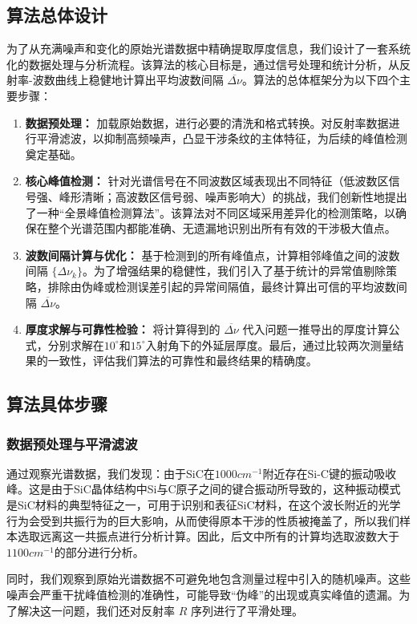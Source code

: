 \documentclass[withoutpreface,bwprint]{cumcmthesis} %
\begin{document}
\subsection{算法总体设计}
为了从充满噪声和变化的原始光谱数据中精确提取厚度信息，我们设计了一套系统化的数据处理与分析流程。该算法的核心目标是，通过信号处理和统计分析，从反射率-波数曲线上稳健地计算出平均波数间隔 $\overline{\Delta\nu}$。算法的总体框架分为以下四个主要步骤：
\begin{enumerate}
    \item \textbf{数据预处理：} 加载原始数据，进行必要的清洗和格式转换。对反射率数据进行平滑滤波，以抑制高频噪声，凸显干涉条纹的主体特征，为后续的峰值检测奠定基础。
    \item \textbf{核心峰值检测：} 针对光谱信号在不同波数区域表现出不同特征（低波数区信号强、峰形清晰；高波数区信号弱、噪声影响大）的挑战，我们创新性地提出了一种“全景峰值检测算法”。该算法对不同区域采用差异化的检测策略，以确保在整个光谱范围内都能准确、无遗漏地识别出所有有效的干涉极大值点。
    \item \textbf{波数间隔计算与优化：} 基于检测到的所有峰值点，计算相邻峰值之间的波数间隔 $\{\Delta\nu_k\}$。为了增强结果的稳健性，我们引入了基于统计的异常值剔除策略，排除由伪峰或检测误差引起的异常间隔值，最终计算出可信的平均波数间隔 $\overline{\Delta\nu}$。
    \item \textbf{厚度求解与可靠性检验：} 将计算得到的 $\overline{\Delta\nu}$ 代入问题一推导出的厚度计算公式，分别求解在$10^\circ$和$15^\circ$入射角下的外延层厚度。最后，通过比较两次测量结果的一致性，评估我们算法的可靠性和最终结果的精确度。
\end{enumerate}

\subsection{算法具体步骤}

\subsubsection{数据预处理与平滑滤波}

通过观察光谱数据，我们发现：由于SiC在$1000cm^{-1}$附近存在Si-C键的振动吸收峰。这是由于SiC晶体结构中Si与C原子之间的键合振动所导致的，这种振动模式是SiC材料的典型特征之一，可用于识别和表征SiC材料，在这个波长附近的光学行为会受到共振行为的巨大影响，从而使得原本干涉的性质被掩盖了，所以我们样本选取远离这一共振点进行分析计算。因此，后文中所有的计算均选取波数大于$1100cm^{-1}$的部分进行分析。

同时，我们观察到原始光谱数据不可避免地包含测量过程中引入的随机噪声。这些噪声会严重干扰峰值检测的准确性，可能导致“伪峰”的出现或真实峰值的遗漏。为了解决这一问题，我们还对反射率 $R$ 序列进行了平滑处理。
\end{document}
